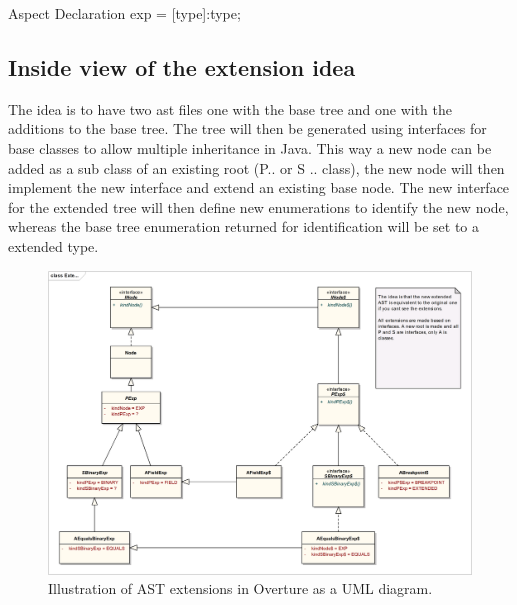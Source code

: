 \documentclass{overturerepchap}
\begin{document}

\begin{astlst}[\lstset{caption=Example showing how a type can be added to all expressions.,label=extendedAstEx}]
Aspect Declaration
exp = [type]:type;
\end{astlst}

\subsection{Inside view of the extension idea}
The idea is to have two ast files one with the base tree and one with the additions to the base tree. The tree will then be generated using interfaces for base classes to allow multiple inheritance in Java. This way a new node can be added as a sub class of an existing root (P.. or S .. class), the new node will then implement the new interface and extend an existing base node. The new interface for the extended tree will then define new enumerations to identify the new node, whereas the base tree enumeration returned for identification will be set to a extended type.

\begin{figure}[tbh]
\centering
\includegraphics[width=\textwidth]{figures/ASTExtend}
\caption{Illustration of AST extensions in Overture as a UML diagram.\label{fig:ASTExtend}}
\end{figure}
\end{document}
